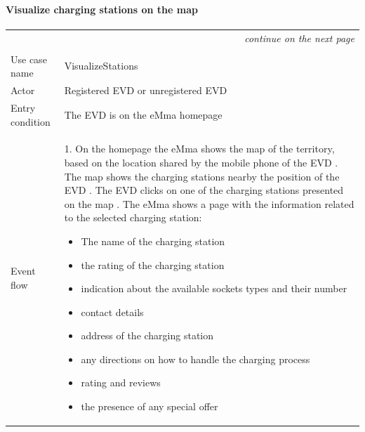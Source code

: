 \paragraph{Visualize charging stations on the map}
\begin{center}
    \begin{longtable}{p{4cm} p{11cm}}
    \multicolumn{2}{r}{\itshape{continue on the next page}}\\
    \endfoot 
    \\
    \endlastfoot
    \hline
     Use case name &  VisualizeStations\\
     \hline
     Actor & Registered EVD or unregistered EVD \\
     \hline
     Entry condition & The EVD is on the eMma homepage \\
     \hline
     Event flow &   1. On the homepage the eMma shows the map of the territory, based on the location shared                by the mobile phone of the EVD \newline
                    2. The map shows the charging stations nearby the position of the EVD \newline
                    3. The EVD clicks on one of the charging stations presented on the map \newline
                    4. The eMma shows a page with the information related to the selected charging station:
                    \begin{adjustwidth}{0.5cm}{}
                        \begin{itemize}
                                \item The name of the charging station
                                \item the rating of the charging station
                                \item indication about the available sockets types and their number
                                \item contact details
                                \item address of the charging station
                                \item any directions on how to handle the charging process
                                \item rating and reviews
                                \item the presence of any special offer
                        \end{itemize}
                    \end{adjustwidth}   

\end{longtable}
\end{center}
